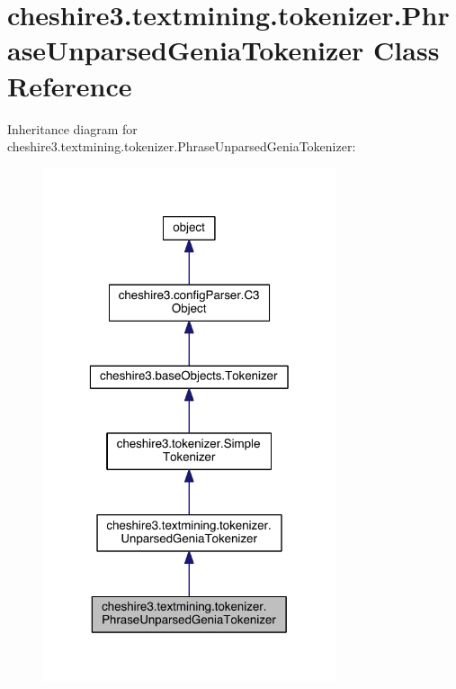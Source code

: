 \hypertarget{classcheshire3_1_1textmining_1_1tokenizer_1_1_phrase_unparsed_genia_tokenizer}{\section{cheshire3.\-textmining.\-tokenizer.\-Phrase\-Unparsed\-Genia\-Tokenizer Class Reference}
\label{classcheshire3_1_1textmining_1_1tokenizer_1_1_phrase_unparsed_genia_tokenizer}
}


Inheritance diagram for cheshire3.\-textmining.\-tokenizer.\-Phrase\-Unparsed\-Genia\-Tokenizer\-:
\nopagebreak
\begin{figure}[H]
\begin{center}
\leavevmode
\includegraphics[width=244pt]{classcheshire3_1_1textmining_1_1tokenizer_1_1_phrase_unparsed_genia_tokenizer__inherit__graph}
\end{center}
\end{figure}


